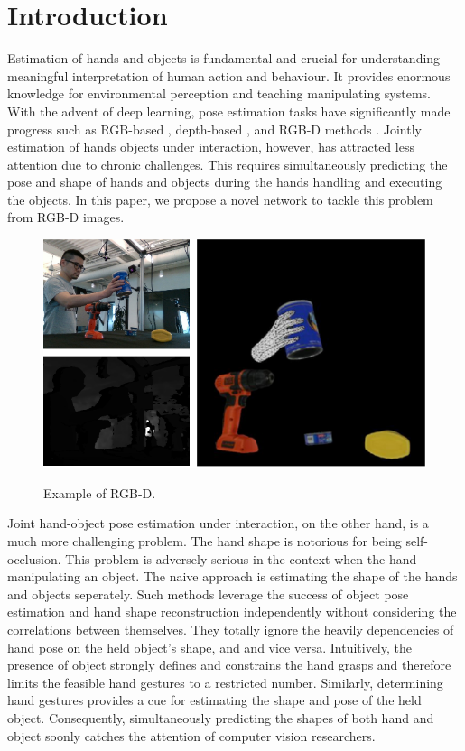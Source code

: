 \section{Introduction}
\label{sec:intro} 
Estimation of hands and objects is fundamental and crucial for understanding meaningful interpretation of human action and
behaviour. It provides enormous knowledge for environmental perception and teaching manipulating systems. With the advent of deep learning, pose estimation tasks have significantly made progress such as RGB-based \cite{cai20203d, zimmermann2017learning, gao2019variational, xiang2017posecnn, tremblay2018deep}, depth-based \cite{oberweger2017deepprior++, moon2018v2v, xiong2019a2j, ge20173d, cai2022ove6d, li2020category}, and RGB-D methods \cite{kazakos2018fusion, yuan20193d}. Jointly estimation of hands objects under interaction, however, has attracted less attention due to chronic challenges. This requires simultaneously predicting the pose and shape of hands and objects during the hands handling and executing the objects. In this paper, we propose a novel network to tackle this problem from RGB-D images. 

\begin{figure}[t]
\center
\includegraphics[width=\linewidth]{Figs/result_exp.png}
\label{fig:result_exp}
\caption{Example of RGB-D.}
\end{figure}

Joint hand-object pose estimation under interaction, on the other hand, is a much more challenging problem. The hand shape is notorious for being self-occlusion. This problem is adversely serious in the context when the hand manipulating an object. The naive approach is estimating the shape of the hands and objects seperately. Such methods leverage the success of object pose estimation and hand shape reconstruction independently without considering the correlations between themselves. They totally ignore the heavily dependencies of hand pose on the held object's shape, and and vice versa. Intuitively, the presence of object strongly defines and constrains the hand grasps and therefore limits the feasible hand gestures to a restricted number. Similarly, determining hand gestures provides a cue for estimating the shape and pose of the held object. Consequently, simultaneously predicting the shapes of both hand and object soonly catches the attention of computer vision researchers. 

